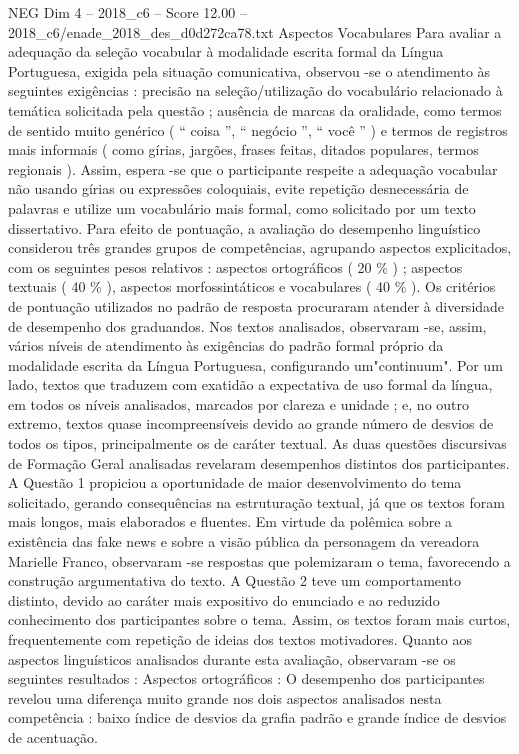\begin{textsample}{NEG Dim 4 – 2018\_c6 – Score 12.00 – 2018\_c6/enade\_2018\_des\_d0d272ca78.txt}
Aspectos Vocabulares Para avaliar a adequação da seleção vocabular à modalidade escrita formal da Língua Portuguesa, exigida pela situação comunicativa, observou -se o atendimento às seguintes exigências : precisão na seleção/utilização do vocabulário relacionado à temática solicitada pela questão ; ausência de marcas da oralidade, como termos de sentido muito genérico ( “ coisa ”, “ negócio ”, “ você ” ) e termos de registros mais informais ( como gírias, jargões, frases feitas, ditados populares, termos regionais ).
Assim, espera -se que o participante respeite a adequação vocabular não usando gírias ou expressões coloquiais, evite repetição desnecessária de palavras e utilize um vocabulário mais formal, como solicitado por um texto dissertativo.
Para efeito de pontuação, a avaliação do desempenho linguístico considerou três grandes grupos de competências, agrupando aspectos explicitados, com os seguintes pesos relativos : aspectos ortográficos ( 20 \% ) ; aspectos textuais ( 40 \% ), aspectos morfossintáticos e vocabulares ( 40 \% ).
Os critérios de pontuação utilizados no padrão de resposta procuraram atender à diversidade de desempenho dos graduandos.
Nos textos analisados, observaram -se, assim, vários níveis de atendimento às exigências do padrão formal próprio da modalidade escrita da Língua Portuguesa, configurando um"continuum".
Por um lado, textos que traduzem com exatidão a expectativa de uso formal da língua, em todos os níveis analisados, marcados por clareza e unidade ; e, no outro extremo, textos quase incompreensíveis devido ao grande número de desvios de todos os tipos, principalmente os de caráter textual.
As duas questões discursivas de Formação Geral analisadas revelaram desempenhos distintos dos participantes.
A Questão 1 propiciou a oportunidade de maior desenvolvimento do tema solicitado, gerando consequências na estruturação textual, já que os textos foram mais longos, mais elaborados e fluentes.
Em virtude da polêmica sobre a existência das fake news e sobre a visão pública da personagem da vereadora Marielle Franco, observaram -se respostas que polemizaram o tema, favorecendo a construção argumentativa do texto.
A Questão 2 teve um comportamento distinto, devido ao caráter mais expositivo do enunciado e ao reduzido conhecimento dos participantes sobre o tema.
Assim, os textos foram mais curtos, frequentemente com repetição de ideias dos textos motivadores.
Quanto aos aspectos linguísticos analisados durante esta avaliação, observaram -se os seguintes resultados : Aspectos ortográficos : O desempenho dos participantes revelou uma diferença muito grande nos dois aspectos analisados nesta competência : baixo índice de desvios da grafia padrão e grande índice de desvios de acentuação.

\end{textsample}
